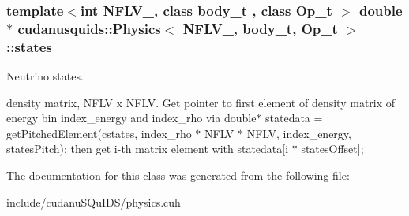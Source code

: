 \subsubsection[{\texorpdfstring{states}{states}}]{\setlength{\rightskip}{0pt plus 5cm}template$<$int N\+F\+L\+V\+\_\+, class body\+\_\+t , class Op\+\_\+t $>$ double$\ast$ {\bf cudanusquids\+::\+Physics}$<$ N\+F\+L\+V\+\_\+, body\+\_\+t, Op\+\_\+t $>$\+::states}\hypertarget{structcudanusquids_1_1Physics_ae9ef595d9cbb5003a19c3c6afce673f8}{}\label{structcudanusquids_1_1Physics_ae9ef595d9cbb5003a19c3c6afce673f8}


Neutrino states. 

density matrix, N\+F\+LV x N\+F\+LV. Get pointer to first element of density matrix of energy bin index\+\_\+energy and index\+\_\+rho via double$\ast$ statedata = get\+Pitched\+Element(cstates, index\+\_\+rho $\ast$ N\+F\+L\+V $\ast$ N\+F\+L\+V, index\+\_\+energy, states\+Pitch); then get i-\/th matrix element with statedata\mbox{[}i $\ast$ states\+Offset\mbox{]}; 

The documentation for this class was generated from the following file\+:\begin{DoxyCompactItemize}
\item 
include/cudanu\+S\+Qu\+I\+D\+S/physics.\+cuh\end{DoxyCompactItemize}
